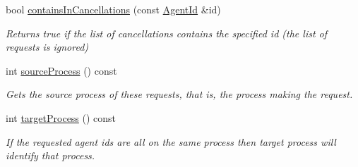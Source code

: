 \begin{DoxyCompactItemize}
bool \hyperlink{classrepast_1_1_agent_request_a680ccca02721405863693f29b2e29ced}{contains\-In\-Cancellations} (const \hyperlink{classrepast_1_1_agent_id}{Agent\-Id} \&id)
\begin{DoxyCompactList}\small\item\em Returns true if the list of cancellations contains the specified id (the list of requests is ignored) \end{DoxyCompactList}\item 
int \hyperlink{classrepast_1_1_agent_request_afd2499472864d7d8eb2780fd02baf372}{source\-Process} () const 
\begin{DoxyCompactList}\small\item\em Gets the source process of these requests, that is, the process making the request. \end{DoxyCompactList}\item 
int \hyperlink{classrepast_1_1_agent_request_a19abc9909ceeb4870c07b638e19d6672}{target\-Process} () const 
\begin{DoxyCompactList}\small\item\em If the requested agent ids are all on the same process then target process will identify that process. \end{DoxyCompactList}\end{DoxyCompactItemize}
